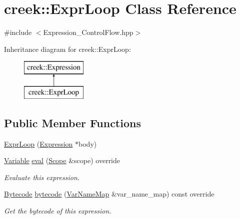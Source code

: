 \hypertarget{classcreek_1_1_expr_loop}{}\section{creek\+:\+:Expr\+Loop Class Reference}
\label{classcreek_1_1_expr_loop}


{\ttfamily \#include $<$Expression\+\_\+\+Control\+Flow.\+hpp$>$}

Inheritance diagram for creek\+:\+:Expr\+Loop\+:\begin{figure}[H]
\begin{center}
\leavevmode
\includegraphics[height=2.000000cm]{classcreek_1_1_expr_loop}
\end{center}
\end{figure}
\subsection*{Public Member Functions}
\begin{DoxyCompactItemize}
\item 
\hyperlink{classcreek_1_1_expr_loop_a3ae1055e21e86ee16d853e26da5a447d}{Expr\+Loop} (\hyperlink{classcreek_1_1_expression}{Expression} $\ast$body)
\item 
\hyperlink{classcreek_1_1_variable}{Variable} \hyperlink{classcreek_1_1_expr_loop_a150a70e174b15df925f3dbbbfb2aae2f}{eval} (\hyperlink{classcreek_1_1_scope}{Scope} \&scope) override
\begin{DoxyCompactList}\small\item\em Evaluate this expression. \end{DoxyCompactList}\item 
\hyperlink{classcreek_1_1_bytecode}{Bytecode} \hyperlink{classcreek_1_1_expr_loop_a061214ec4468944c487af6673b8331c7}{bytecode} (\hyperlink{classcreek_1_1_var_name_map}{Var\+Name\+Map} \&var\+\_\+name\+\_\+map) const  override\hypertarget{classcreek_1_1_expr_loop_a061214ec4468944c487af6673b8331c7}{}\label{classcreek_1_1_expr_loop_a061214ec4468944c487af6673b8331c7}

\begin{DoxyCompactList}\small\item\em Get the bytecode of this expression. \end{DoxyCompactList}\end{DoxyCompactItemize}


